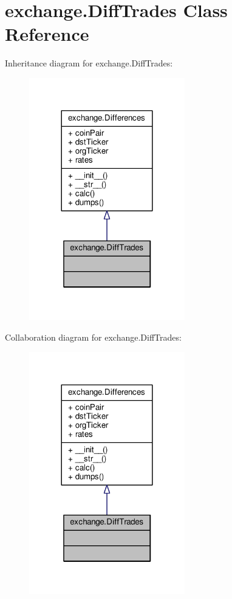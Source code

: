 \hypertarget{classexchange_1_1_diff_trades}{}\section{exchange.\+Diff\+Trades Class Reference}
\label{classexchange_1_1_diff_trades}


Inheritance diagram for exchange.\+Diff\+Trades\+:
\nopagebreak
\begin{figure}[H]
\begin{center}
\leavevmode
\includegraphics[width=192pt]{classexchange_1_1_diff_trades__inherit__graph}
\end{center}
\end{figure}


Collaboration diagram for exchange.\+Diff\+Trades\+:
\nopagebreak
\begin{figure}[H]
\begin{center}
\leavevmode
\includegraphics[width=192pt]{classexchange_1_1_diff_trades__coll__graph}
\end{center}
\end{figure}
